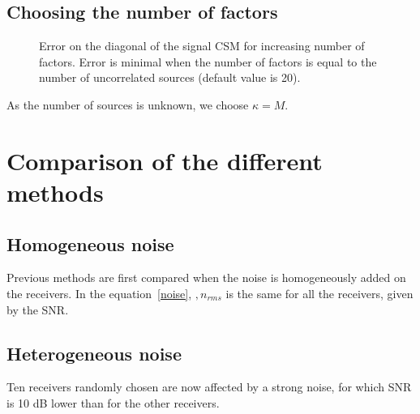 \documentclass[fontsize=12pt,DIV13,paper=a4,abstract=true,titlepage=false]{scrartcl}
\begin{document}
\subsection{Choosing the number of factors}

\begin{figure}[H]
	\centering
	
	\caption{Error on the diagonal of the signal CSM for increasing number of factors. Error is minimal when the number of factors is equal to the number of uncorrelated sources (default value is 20).}
\end{figure}
As the number of sources is unknown, we choose $\kappa=M$. 


\section{Comparison of the different methods}

\subsection{Homogeneous noise}
Previous methods are first compared when the noise is homogeneously added on the receivers. In the equation~\ref{noise}, $,n_{rms}$ is the same for all the receivers, given by the SNR.

\subsection{Heterogeneous noise}
Ten receivers randomly chosen are now affected by a strong noise, for which SNR is 10 dB lower than for the other receivers.

























%


% 
\end{document}
